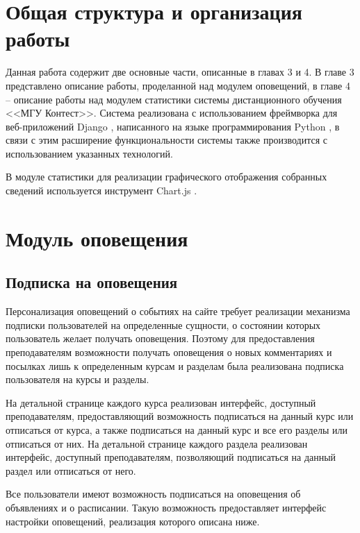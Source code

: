 \documentclass[12pt, a4paper, oneside]{article}
\begin{document}
\section{Общая структура и организация работы}
Данная работа содержит две основные части, описанные в главах 3 и 4. В главе 3 представлено описание работы, проделанной над модулем оповещений, в главе 4 – описание работы над модулем статистики системы дистанционного обучения <<МГУ Контест>>. Система реализована с использованием фреймворка для веб-приложений Django \cite{django}, написанного на языке программирования Python \cite{python}, в связи с этим расширение функциональности системы также производится с использованием указанных технологий.

В модуле статистики для реализации графического отображения собранных сведений используется инструмент Chart.js \cite{chartjs}.
\newpage

\section{Модуль оповещения}
\subsection{Подписка на оповещения}
Персонализация оповещений о событиях на сайте требует реализации механизма подписки пользователей на определенные сущности, о состоянии которых пользователь желает получать оповещения. Поэтому для предоставления преподавателям возможности получать оповещения о новых комментариях и посылках лишь к определенным курсам и разделам была реализована подписка пользователя на курсы и разделы.

На детальной странице каждого курса реализован интерфейс, доступный преподавателям, предоставляющий возможность подписаться на данный курс или отписаться от курса, а также подписаться на данный курс и все его разделы или отписаться от них. На детальной странице каждого раздела реализован интерфейс, доступный преподавателям, позволяющий подписаться на данный раздел или отписаться от него.

Все пользователи имеют возможность подписаться на оповещения об объявлениях и о расписании. Такую возможность предоставляет интерфейс настройки оповещений, реализация которого описана ниже.
\end{document}
